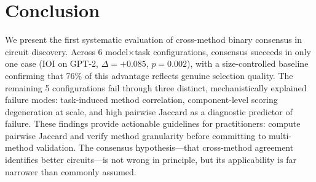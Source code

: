 \documentclass[11pt,a4paper]{article}
\begin{document}
\section{Conclusion}
\label{sec:conclusion}

We present the first systematic evaluation of cross-method binary consensus in circuit discovery. Across 6 model$\times$task configurations, consensus succeeds in only one case (IOI on GPT-2, $\Delta=+0.085$, $p=0.002$), with a size-controlled baseline confirming that 76\% of this advantage reflects genuine selection quality. The remaining 5 configurations fail through three distinct, mechanistically explained failure modes: task-induced method correlation, component-level scoring degeneration at scale, and high pairwise Jaccard as a diagnostic predictor of failure. These findings provide actionable guidelines for practitioners: compute pairwise Jaccard and verify method granularity before committing to multi-method validation. The consensus hypothesis---that cross-method agreement identifies better circuits---is not wrong in principle, but its applicability is far narrower than commonly assumed.
\end{document}
